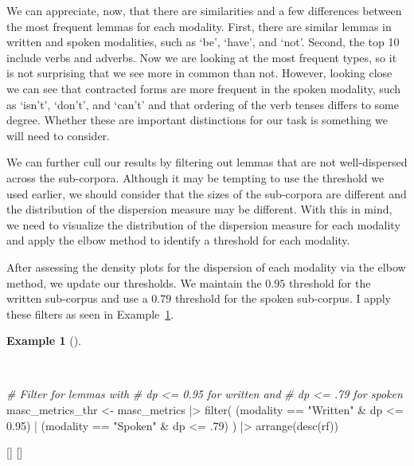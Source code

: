 \documentclass[
  letterpaper,
  krantz1]{latex/krantz-mod}
\newenvironment{Shaded}{\begin{snugshade}}{\end{snugshade}}
\newcommand{\CommentTok}[1]{\textcolor[rgb]{0.00,0.00,0.00}{\textit{#1}}}
\newcommand{\DecValTok}[1]{\textcolor[rgb]{0.00,0.00,0.00}{#1}}
\newcommand{\FloatTok}[1]{\textcolor[rgb]{0.00,0.00,0.00}{#1}}
\newcommand{\FunctionTok}[1]{\textcolor[rgb]{0.00,0.00,0.00}{#1}}
\newcommand{\NormalTok}[1]{\textcolor[rgb]{0.00,0.00,0.00}{#1}}
\newcommand{\OtherTok}[1]{\textcolor[rgb]{0.00,0.00,0.00}{#1}}
\newcommand{\SpecialCharTok}[1]{\textcolor[rgb]{0.00,0.00,0.00}{#1}}
\newcommand{\StringTok}[1]{\textcolor[rgb]{0.00,0.00,0.00}{#1}}
\newcommand{\cindex}[1]{%
  \StrSubstitute{#1}{_}{\_}[\temp]%
  \index{\temp}%
}
\theoremstyle{definition}
\theoremstyle{definition}
\newtheorem{example}{Example}[chapter]
\theoremstyle{remark}
\begin{document}
We can appreciate, now, that there are similarities and a few
differences between the most frequent lemmas for each modality. First,
there are similar lemmas in written and spoken modalities, such as `be',
`have', and `not'. Second, the top 10 include verbs and adverbs. Now we
are looking at the most frequent types, so it is not surprising that we
see more in common than not. However, looking close we can see that
contracted forms are more frequent in the spoken modality, such as
`isn't', `don't', and `can't' and that ordering of the verb tenses
differs to some degree. Whether these are important distinctions for our
task is something we will need to consider.

We can further cull our results by filtering out lemmas that are not
well-dispersed across the sub-corpora. Although it may be tempting to
use the threshold we used earlier, we should consider that the sizes of
the sub-corpora are different and the distribution of the dispersion
measure may be different. With this in mind, we need to visualize the
distribution of the dispersion measure for each modality and apply the
elbow method to identify a threshold for each
modality.

After assessing the density plots for the dispersion of each modality
via the elbow method, we update our thresholds. We maintain the \(0.95\)
threshold for the written sub-corpus and use a \(0.79\) threshold for
the spoken sub-corpus. I apply these filters as seen in
Example~\ref{exm-explore-masc-subcorpora-filtered}.

\pagebreak

\begin{example}[]\protect\hypertarget{exm-explore-masc-subcorpora-filtered}{}\label{exm-explore-masc-subcorpora-filtered}

~

\begin{Shaded}
\begin{Highlighting}[numbers=left,,]
\CommentTok{\# Filter for lemmas with}
\CommentTok{\# dp \textless{}= 0.95 for written and}
\CommentTok{\# dp \textless{}= .79 for spoken}
\NormalTok{masc\_metrics\_thr }\OtherTok{\textless{}{-}}
\NormalTok{  masc\_metrics }\SpecialCharTok{|\textgreater{}}
  \FunctionTok{filter}\NormalTok{(}
\NormalTok{    (modality }\SpecialCharTok{==} \StringTok{"Written"} \SpecialCharTok{\&}\NormalTok{ dp }\SpecialCharTok{\textless{}=} \FloatTok{0.95}\NormalTok{) }\SpecialCharTok{|}
\NormalTok{    (modality }\SpecialCharTok{==} \StringTok{"Spoken"} \SpecialCharTok{\&}\NormalTok{ dp }\SpecialCharTok{\textless{}=}\NormalTok{ .}\DecValTok{79}\NormalTok{)}
\NormalTok{  ) }\SpecialCharTok{|\textgreater{}}
  \FunctionTok{arrange}\NormalTok{(}\FunctionTok{desc}\NormalTok{(rf))}
\end{Highlighting}
\end{Shaded}

 \cindex{filter()}\cindex{arrange()}

\end{example}
\end{document}
